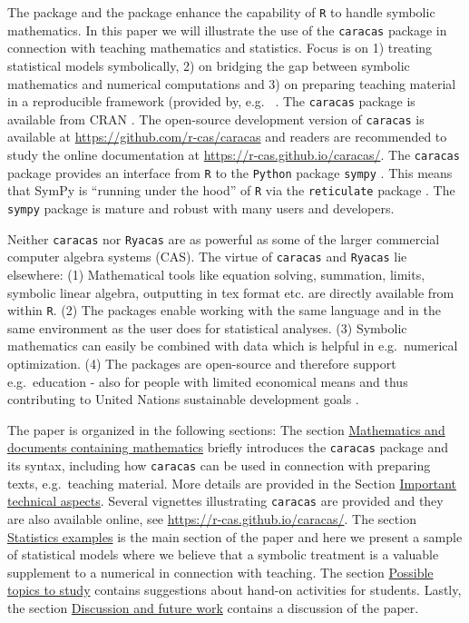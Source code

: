 The  package \citep{caracas:21} and the  package \citep{ryacas} enhance the capability of \texttt{R} \citep{R} to handle symbolic mathematics. In this paper
we will illustrate the use of the \texttt{caracas} package in connection with
teaching mathematics and statistics.
Focus
is on 1) treating statistical models symbolically, 2) on bridging the
gap between symbolic mathematics and numerical computations and 3) on
preparing teaching material in a reproducible framework (provided by, e.g.~
\citep{rmarkdown, RMarkdownDefinitiveGuide, RMarkdownCookbook}. The \texttt{caracas} package is available from CRAN \citep{R}.
The open-source development version of \texttt{caracas} is available at
\url{https://github.com/r-cas/caracas} and readers are recommended to study the online
documentation at \url{https://r-cas.github.io/caracas/}.
The \texttt{caracas} package provides
an interface from \texttt{R} to the
\texttt{Python} package \texttt{sympy} \citep{sympy}. This means that SymPy is
``running under the hood'' of \texttt{R} via the \texttt{reticulate}
package \citep{reticulate}. The \texttt{sympy} package is mature and robust with
many users and developers.

Neither \texttt{caracas} nor \texttt{Ryacas} are as powerful as some
of the larger commercial computer algebra systems (CAS). The virtue of
\texttt{caracas} and \texttt{Ryacas} lie elsewhere:
(1) Mathematical tools like equation solving, summation, limits, symbolic linear
algebra, outputting in tex format etc. are directly available from
within \texttt{R}.
(2) The packages enable working with the same language and in the same
environment as the user does for statistical analyses.
(3) Symbolic mathematics can easily be combined with data which is
helpful in e.g.~numerical optimization.
(4) The packages are open-source and therefore support e.g.~education - also for people
with limited economical means and thus contributing to United
Nations sustainable development goals \citep{UN17}.

The paper is organized in the following sections:
The section \protect\hyperlink{mathematics-and-documents-containing-mathematics}{Mathematics and documents containing mathematics} briefly introduces the \texttt{caracas} package
and its syntax, including
how \texttt{caracas} can be used in connection with preparing texts, e.g.~teaching
material.
More details are provided in the Section \protect\hyperlink{important-technical-aspects}{Important technical aspects}.
Several vignettes illustrating
\texttt{caracas} are provided and they are also available online, see
\url{https://r-cas.github.io/caracas/}.
The section \protect\hyperlink{statistics-examples}{Statistics examples} is the main section of the
paper and here we present a sample of statistical models where we
believe that a symbolic treatment is a valuable supplement to a
numerical in connection with teaching.
The section \protect\hyperlink{possible-topics-to-study}{Possible topics to study} contains suggestions about
hand-on activities for students.
Lastly,
the section \protect\hyperlink{discussion-and-future-work}{Discussion and future work} contains a discussion of the paper.

